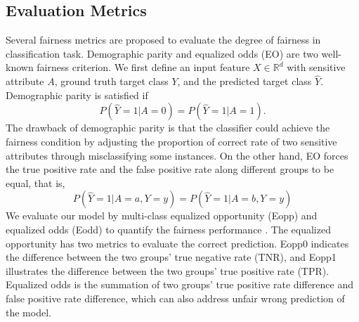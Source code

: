 \subsection{Evaluation Metrics}
\label{sec:evaluation_metrics}
Several fairness metrics are proposed to evaluate the degree of fairness in classification task. Demographic parity \cite{dwork2012fairness} and equalized odds (EO) \cite{hardt2016equality,dwork2012fairness} are two well-known fairness criterion. We first define an input feature $X \in \mathbb{R}^d$ with sensitive attribute $A$, ground truth target class $Y$, and the predicted target class $\hat{Y}$. Demographic parity is satisfied if 
\begin{equation}
\label{eq.DEO}
P(\hat{Y} = 1|A = 0) = P(\hat{Y} = 1|A = 1).
\end{equation}
The drawback of demographic parity is that the classifier could achieve the fairness condition by adjusting the proportion of correct rate of two sensitive attributes through misclassifying some instances. On the other hand, EO forces the true positive rate and the false positive rate along different groups to be equal, that is, 
\begin{equation}
\label{eq.EO}
P(\hat{Y} = 1|A = a, Y = y) = P(\hat{Y} = 1|A = b, Y = y)
\end{equation}
We evaluate our model by multi-class equalized opportunity (Eopp) and equalized odds (Eodd) to quantify the fairness performance \cite{Hardt2016EqualityOO}. The equalized opportunity has two metrics to evaluate the correct prediction. Eopp0 indicates the difference between the two groups' true negative rate (TNR), and Eopp1 illustrates the difference between the two groups' true positive rate (TPR). Equalized odds is the summation of two groups' true positive rate difference and false positive rate difference, which can also address unfair wrong prediction of the model.


